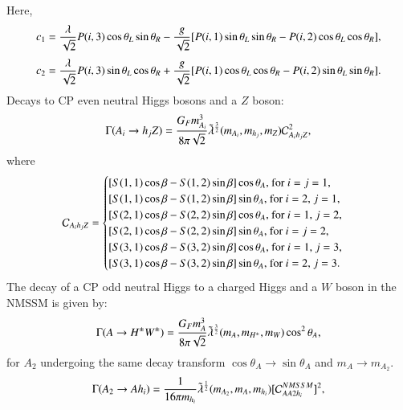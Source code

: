 \documentclass[final,3p,times]{elsarticle}
\begin{document}
Here,
\begin{equation}
c_{1} = {\lambda \over \sqrt{2}}P(i,3)\cos\theta_L \sin\theta_R - {g \over \sqrt{2}}[P(i,1)\sin\theta_L \sin\theta_R - P(i,2)\cos\theta_L \cos\theta_R],
\end{equation}
\begin{equation}
c_{2} = {\lambda \over \sqrt{2}}P(i,3)\sin\theta_L \cos\theta_R + {g \over \sqrt{2}}[P(i,1)\cos\theta_L \cos\theta_R - P(i,2)\sin\theta_L \sin\theta_R].
\end{equation}
Decays to CP even neutral Higgs bosons and a $Z$ boson:
\begin{equation} \label{AhZNMSSM}
\Gamma(A_i \rightarrow h_j Z) = {G_{F} m_{A_i}^3 \over 8 \pi \sqrt{2}} \tilde{\lambda}^{3 \over 2}(m_{A_i},m_{h_j},m_{Z}) \mathcal{C}_{A_i h_j Z}^2,
\end{equation}
where
\begin{equation}
\mathcal{C}_{A_i h_j Z} = \begin{cases}
							[S(1,1)\cos\beta - S(1,2)\sin\beta]\cos\theta_A $, for $i=j=1$,$ \\
							[S(1,1)\cos\beta - S(1,2)\sin\beta]\sin\theta_A $, for $i=2$, $j=1$,$ \\
							[S(2,1)\cos\beta - S(2,2)\sin\beta]\cos\theta_A $, for $i=1$, $j=2$,$ \\
							[S(2,1)\cos\beta - S(2,2)\sin\beta]\sin\theta_A $, for $i=j=2$,$ \\
							[S(3,1)\cos\beta - S(3,2)\sin\beta]\cos\theta_A $, for $i=1$, $j=3$,$ \\
							[S(3,1)\cos\beta - S(3,2)\sin\beta]\sin\theta_A $, for $i=2$, $j=3. \\
							\end{cases}
\end{equation}
The decay of a CP odd neutral Higgs to a charged Higgs and a $W$ boson in the NMSSM is given by:
\begin{equation} \label{AHpmWNMSSM}
\Gamma(A \rightarrow H^{\pm} W^{\pm}) = {G_{F} m_{A}^3 \over 8 \pi \sqrt{2}} \tilde{\lambda}^{3 \over 2}(m_{A},m_{H^{\pm}},m_{W}) \cos^2 \theta_A,
\end{equation}
for $A_2$ undergoing the same decay transform $\cos\theta_A \rightarrow \sin\theta_A$ and $m_{A} \rightarrow m_{A_2}$.
\begin{equation} \label{A2AhiNMSSM}
\Gamma(A_2 \rightarrow A h_i) = {1 \over 16 \pi m_{h_i}} \tilde{\lambda}^{1 \over 2}(m_{A_2},m_{A},m_{h_i})[\mathcal{C}_{AA2h_i}^{NMSSM}]^2,
\end{equation}
\end{document}
